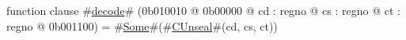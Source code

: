 function clause #\hyperref[zdecode]{decode}# (0b010010 @ 0b00000 @ cd : regno @ cs : regno @ ct : regno @ 0b001100) = #\hyperref[zSome]{Some}#(#\hyperref[zCUnseal]{CUnseal}#(cd, cs, ct))
